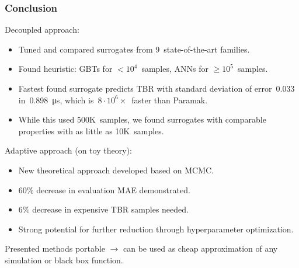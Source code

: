\begin{frame}
	\frametitle{Conclusion}

	Decoupled approach:

	\begin{itemize}
		\item
			Tuned and compared surrogates from 9~state-of-the-art families.
		\item
			Found heuristic: GBTs for $<10^4$~samples,
			ANNs for $\geq10^5$~samples.
		\item
			Fastest found surrogate predicts TBR with standard deviation of
			error~$\num{0.033}$ in~\SI{0.898}{\micro\second}, which is~$8\cdot
			10^6\times$~faster than Paramak.
		\item
			While this used 500K~samples, we found surrogates with
			comparable properties with as little as 10K~samples.
	\end{itemize}

	\vspace{0.5em}

	Adaptive approach (on toy theory):
	\begin{itemize}
	    \item
	        New theoretical approach developed based on MCMC.
		\item 
			$60\%$ decrease in evaluation MAE demonstrated.
		\item
			$6\%$ decrease in expensive TBR samples needed.
		\item
			Strong potential for further reduction through hyperparameter optimization.
	\end{itemize}

	\vspace{0.5em}

	Presented methods portable $\rightarrow$ can be used as cheap
	approximation of any simulation or black box function.
\end{frame}

